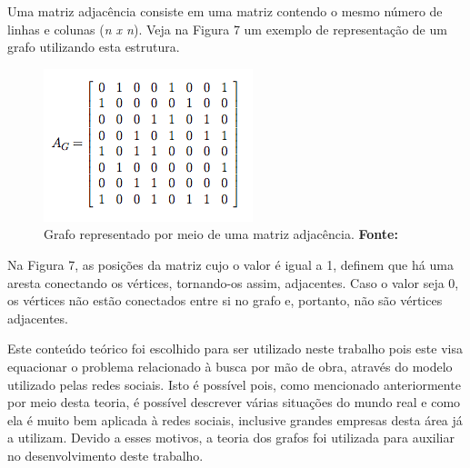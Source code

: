 Uma matriz adjacência consiste em uma matriz contendo o mesmo número de linhas e colunas (\textit{n x n}). Veja na Figura 7 um exemplo de representação de um grafo utilizando esta estrutura.

\begin{figure}[h!]
	\centerline{\includegraphics[scale=0.7]{./imagens/matriz_adjacencia.png}}
	\caption[Grafo representado por meio de uma matriz adjacência]
	{Grafo representado por meio de uma matriz adjacência. \textbf{Fonte:} }
	\label{fig:exemplo1}
\end{figure}

Na Figura 7, as posições da matriz cujo o valor é igual a 1, definem que há uma aresta conectando os vértices, tornando-os assim, adjacentes. Caso o valor seja 0, os vértices não estão conectados entre si no grafo e, portanto, não são vértices adjacentes.

\par Este conteúdo teórico foi escolhido para ser utilizado neste trabalho pois este visa equacionar o problema relacionado à busca por mão de obra, através do modelo utilizado pelas redes sociais. Isto é possível pois, como mencionado anteriormente por meio desta teoria, é possível descrever várias situações do mundo real e como ela é muito bem aplicada à redes sociais, inclusive grandes empresas desta área já a utilizam. Devido a esses motivos, a teoria dos grafos foi utilizada para auxiliar no desenvolvimento deste trabalho.
